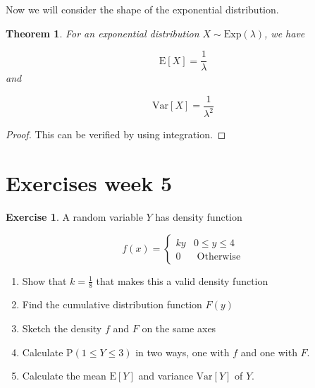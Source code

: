 \documentclass[
]{book}
\newtheorem{theorem}{Theorem}[chapter]
\theoremstyle{definition}
\theoremstyle{definition}
\theoremstyle{definition}
\newtheorem{exercise}{Exercise}[chapter]
\theoremstyle{definition}
\theoremstyle{remark}
\begin{document}
Now we will consider the shape of the exponential distribution.

\begin{theorem}
For an exponential distribution \(X\sim \text{Exp}(\lambda)\), we have

\[\text{E}[X] = \frac{1}{\lambda}\]
and

\[\text{Var}[X] = \frac{1}{\lambda ^2}\]
\end{theorem}

\begin{proof}
This can be verified by using integration.
\end{proof}

\hypertarget{exercises-week-5}{%
\section{Exercises week 5}\label{exercises-week-5}}

\begin{exercise}

A random variable \(Y\) has density function

\begin{equation*}
  f(x)=\begin{cases}
        ky & 0 \leq y \leq 4 \\
        0 &  \text{     Otherwise}
  \end{cases}
\end{equation*}

\begin{enumerate}
\def\labelenumi{\alph{enumi})}
\item
  Show that \(k = \frac{1}{8}\) that makes this a valid density function
\item
  Find the cumulative distribution function \(F(y)\)
\item
  Sketch the density \(f\) and \(F\) on the same axes
\item
  Calculate \(\text{P}(1\leq Y \leq 3)\) in two ways, one with \(f\) and one with \(F\).
\item
  Calculate the mean \(\text{E}[Y]\) and variance \(\text{Var}[Y]\) of \(Y\).
\end{enumerate}

\end{exercise}
\end{document}

